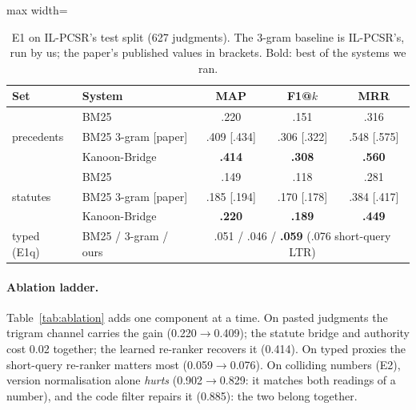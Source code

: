 \documentclass[sigconf,nonacm]{acmart}
\begin{document}
\begin{table}[t]
\centering\small
\caption{E1 on IL-PCSR's test split (627 judgments). The 3-gram baseline is IL-PCSR's, run by us;
the paper's published values in brackets. Bold: best of the systems we ran.}
\label{tab:e1}
\begin{adjustbox}{max width=\linewidth}
\begin{tabular}{llccc}
\toprule
Set & System & MAP & F1@$k$ & MRR \\
\midrule
\multirow{3}{*}{precedents} & BM25 & .220 & .151 & .316 \\
 & BM25 3-gram [paper] & .409 [.434] & .306 [.322] & .548 [.575] \\
 & Kanoon-Bridge & \textbf{.414} & \textbf{.308} & \textbf{.560} \\
\midrule
\multirow{3}{*}{statutes} & BM25 & .149 & .118 & .281 \\
 & BM25 3-gram [paper] & .185 [.194] & .170 [.178] & .384 [.417] \\
 & Kanoon-Bridge & \textbf{.220} & \textbf{.189} & \textbf{.449} \\
\midrule
typed (E1q) & BM25 / 3-gram / ours & \multicolumn{3}{c}{.051 / .046 / \textbf{.059} (.076 short-query LTR)} \\
\bottomrule
\end{tabular}
\end{adjustbox}
\end{table}

\paragraph{Ablation ladder.} Table~\ref{tab:ablation} adds one component at a time. On pasted
judgments the trigram channel carries the gain (0.220$\to$0.409); the statute bridge and authority
cost 0.02 together; the learned re-ranker recovers it (0.414). On typed proxies the short-query
re-ranker matters most (0.059$\to$0.076). On colliding numbers (E2), version normalisation alone
\emph{hurts} (0.902$\to$0.829: it matches both readings of a number), and the code filter repairs it
(0.885): the two belong together.
\end{document}
